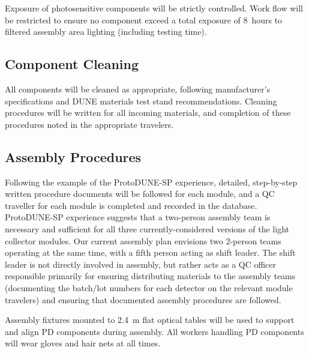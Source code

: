 Exposure of photosensitive components will be strictly controlled.  Work flow will be restricted to ensure no component exceed a total exposure of \SI{8}{hours} to filtered assembly area lighting (including testing time).

\subsection{Component Cleaning}

All components will be cleaned  as appropriate, following manufacturer's specifications and DUNE materials test stand recommendations.  Cleaning procedures will be written for all incoming materials, and completion of these procedures noted in the appropriate travelers.

\subsection{Assembly Procedures}

Following the example of the ProtoDUNE-SP experience, detailed, step-by-step written procedure documents will be followed for each module, and a QC traveller for each module is completed and recorded in the database.  ProtoDUNE-SP experience suggests that a two-person assembly team is necessary and sufficient for all three currently-considered versions of the light collector modules.  Our current assembly plan envisions two 2-person teams operating at the same time, with a fifth person acting as shift leader.  The shift leader is not directly involved in assembly, but rather acts as a QC officer responsible primarily for ensuring distributing materials to the assembly teams (documenting the batch/lot numbers for each detector on the relevant module travelers) and ensuring that documented assembly procedures are followed.

Assembly fixtures mounted to \SI{2.4}{m} flat optical tables will be used to support and align PD components during assembly.  All workers handling PD components will wear gloves and hair nets at all times.



